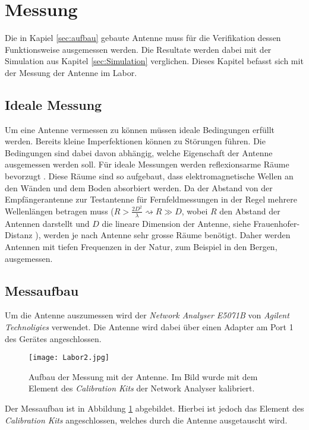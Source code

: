 \section{Messung}\label{sec:Messung}

Die in Kapiel \ref{sec:aufbau} gebaute Antenne muss für die Verifikation dessen Funktionsweise ausgemessen werden. Die Resultate werden dabei mit der Simulation aus Kapitel \ref{sec:Simulation} verglichen. Dieses Kapitel befasst sich mit der Messung der Antenne im Labor.

\subsection{Ideale Messung}

Um eine Antenne vermessen zu können müssen ideale Bedingungen erfüllt werden. Bereits kleine Imperfektionen können zu Störungen führen. Die Bedingungen sind dabei davon abhängig, welche Eigenschaft der Antenne ausgemessen werden soll.
Für ideale Messungen werden reflexionsarme Räume bevorzugt \cite{range}. Diese Räume sind so aufgebaut, dass elektromagnetische Wellen an den Wänden und dem Boden absorbiert werden. Da der Abstand von der Empfängerantenne zur Testantenne für Fernfeldmessungen in der Regel mehrere Wellenlängen betragen muss ($R > \frac{2D^2}{\lambda} \rightsquigarrow R \gg D$, wobei $R$ den Abstand der Antennen darstellt und $D$ die lineare Dimension der Antenne, siehe Frauenhofer-Distanz \cite{frauenhofer}), werden je nach Antenne sehr grosse Räume benötigt. Daher werden Antennen mit tiefen Frequenzen in der Natur, zum Beispiel in den Bergen, ausgemessen.

\subsection{Messaufbau}

Um die Antenne auszumessen wird der \textit{Network Analyser E5071B} von \textit{Agilent Technoligies} verwendet. Die Antenne wird dabei über einen Adapter am Port 1 des Gerätes angeschlossen.

\begin{figure}[h!]
	\centering
	\texttt{[image: Labor2.jpg]}
	\caption{Aufbau der Messung mit der Antenne. Im Bild wurde mit dem Element des \textit{Calibration Kits} der Network Analyser kalibriert.}
	\label{fig:Messung_Labor}
\end{figure}

Der Messaufbau ist in Abbildung \ref{fig:Messung_Labor} abgebildet. Hierbei ist jedoch das Element des \textit{Calibration Kits} angeschlossen, welches durch die Antenne ausgetauscht wird.

